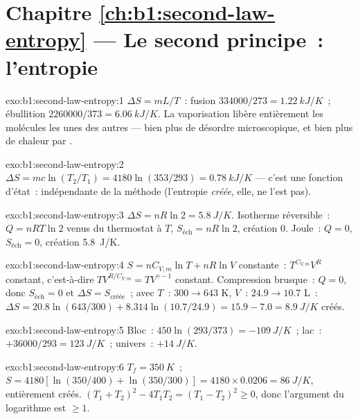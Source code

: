 \section*{Chapitre \ref{ch:b1:second-law-entropy} --- Le second principe~: l'entropie}

\begin{solution}{exo:b1:second-law-entropy:1}
$\Delta S = mL/T$~: fusion $334000/273 = \qty{1.22}{kJ/K}$~; ébullition $2260000/
373 = \qty{6.06}{kJ/K}$. La vaporisation libère entièrement les molécules les
unes des autres --- bien plus de désordre microscopique, et bien plus de
chaleur par .
\end{solution}

\begin{solution}{exo:b1:second-law-entropy:2}
$\Delta S = mc\ln(T_2/T_1) = 4180\ln(353/293) = \qty{0.78}{kJ/K}$ --- c'est une
fonction d'état~: indépendante de la méthode (l'entropie \emph{créée}, elle, ne l'est pas).
\end{solution}

\begin{solution}{exo:b1:second-law-entropy:3}
$\Delta S = nR\ln2 = \qty{5.8}{J/K}$. Isotherme réversible~: $Q = nRT\ln2$
venus du thermostat à $T$, $S_{\text{éch}} = nR\ln2$, création $0$. Joule~:
$Q = 0$, $S_{\text{éch}} = 0$, création \qty{5.8}{J/K}.
\end{solution}

\begin{solution}{exo:b1:second-law-entropy:4}
$S = nC_{V,m}\ln T + nR\ln V$ constante~: $T^{C_{V,m}}V^R$ constant, c'est-à-dire
$TV^{R/C_{V,m}} = TV^{\gamma - 1}$ constant. Compression brusque~: $Q = 0$, donc
$S_{\text{éch}} = 0$ et $\Delta S = S_{\text{créée}}$~; avec $T$~: $300 \to
643$ K, $V$~: $24.9 \to 10.7$ L~: $\Delta S = 20.8\ln(643/300) + 8.314\ln(10.7/
24.9) = 15.9 - 7.0 = \qty{+8.9}{J/K}$ créés.
\end{solution}

\begin{solution}{exo:b1:second-law-entropy:5}
Bloc~: $450\ln(293/373) = \qty{-109}{J/K}$~; lac~: $+36000/293 = \qty{+123}{J/K}$~;
univers~: $+\qty{14}{J/K}$.
\end{solution}

\begin{solution}{exo:b1:second-law-entropy:6}
$T_f = \qty{350}{K}$~; $S = 4180[\ln(350/400) + \ln(350/300)] = 4180 \times
0.0206 = \qty{86}{J/K}$, entièrement créés. $(T_1 + T_2)^2 - 4T_1T_2 = (T_1 - T_2)^2
\geq 0$, donc l'argument du logarithme est $\geq 1$.
\end{solution}

